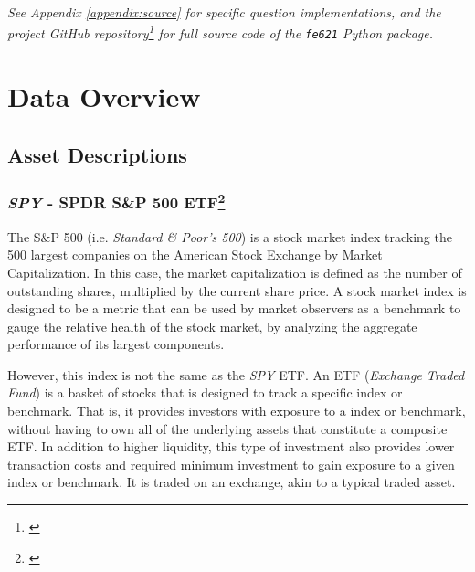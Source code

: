 \documentclass[10pt]{article}
\begin{document}
\begin{center}
    \textit{See Appendix \ref{appendix:source} for specific question implementations, and the project GitHub repository\footnote{\cite{Weerawarana2019}} for full source code of the \texttt{fe621} Python package.}
\end{center}



\newpage

\section{Data Overview}

    \subsection{Asset Descriptions}

        \subsubsection[\textit{SPY} - SPDR S\&P 500 ETF]{\textit{SPY} - SPDR S\&P 500 ETF\footnote{\cite{StateStreetGlobalAdvisors2019}}}

        The S\&P 500 (i.e. \textit{Standard \& Poor's 500}) is a stock market index tracking the 500 largest companies on the American Stock Exchange by Market Capitalization. In this case, the market capitalization is defined as the number of outstanding shares, multiplied by the current share price. A stock market index is designed to be a metric that can be used by market observers as a benchmark to gauge the relative health of the stock market, by analyzing the aggregate performance of its largest components.
            
        However, this index is not the same as the \textit{SPY} ETF. An ETF (\textit{Exchange Traded Fund}) is a basket of stocks that is designed to track a specific index or benchmark. That is, it provides investors with exposure to a index or benchmark, without having to own all of the underlying assets that constitute a composite ETF. In addition to higher liquidity, this type of investment also provides lower transaction costs and required minimum investment to gain exposure to a given index or benchmark. It is traded on an exchange, akin to a typical traded asset.
\end{document}
